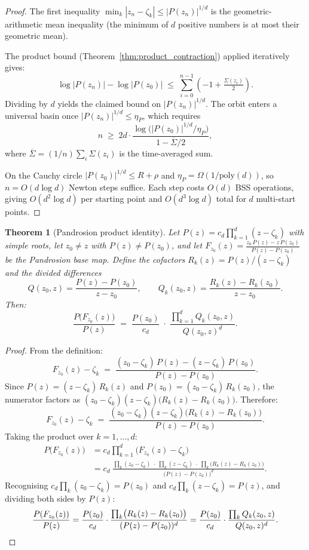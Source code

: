 \documentclass[10pt,a4paper,oneside]{book}
\newtheorem{theorem}{Theorem}[chapter]
\theoremstyle{definition}
\theoremstyle{remark}
\begin{document}
\begin{proof}
The first inequality $\min_k|z_n - \zeta_k| \leq |P(z_n)|^{1/d}$ is the geometric-arithmetic mean inequality (the minimum of $d$ positive numbers is at most their geometric mean).

The product bound (Theorem~\ref{thm:product_contraction}) applied iteratively gives:
\[
  \log|P(z_n)| - \log|P(z_0)| \;\leq\; \sum_{i=0}^{n-1}\left(-1 + \tfrac{\Sigma(z_i)}{2}\right).
\]
Dividing by $d$ yields the claimed bound on $|P(z_n)|^{1/d}$.  The orbit enters a universal basin once $|P(z_n)|^{1/d} \leq \eta_P$, which requires
\[
  n \;\geq\; 2d\cdot\frac{\log\bigl(|P(z_0)|^{1/d}/\eta_P\bigr)}{1 - \overline{\Sigma}/2},
\]
where $\overline{\Sigma} = (1/n)\sum_i \Sigma(z_i)$ is the time-averaged sum.

On the Cauchy circle $|P(z_0)|^{1/d} \leq R + \rho$ and $\eta_P = \Omega(1/\mathrm{poly}(d))$, so $n = O(d\log d)$ Newton steps suffice.  Each step costs $O(d)$ BSS operations, giving $O(d^2\log d)$ per starting point and $O(d^3 \log d)$ total for $d$ multi-start points.
\end{proof}

\begin{theorem}[Pandrosion product identity]
\label{thm:pandrosion_product}
Let $P(z) = c_d\prod_{k=1}^d (z - \zeta_k)$ with simple roots, let $z_0 \neq z$ with $P(z) \neq P(z_0)$, and let $F_{z_0}(z) = \frac{z_0\,P(z) - z\,P(z_0)}{P(z) - P(z_0)}$ be the Pandrosion base map.  Define the cofactors $R_k(z) = P(z)/(z - \zeta_k)$ and the divided differences
\[
  Q(z_0,z) = \frac{P(z) - P(z_0)}{z - z_0}, \qquad
  Q_k(z_0,z) = \frac{R_k(z) - R_k(z_0)}{z - z_0}.
\]
Then:
\begin{equation}
  \label{eq:pandrosion_product}
  \frac{P\bigl(F_{z_0}(z)\bigr)}{P(z)}
  \;=\; \frac{P(z_0)}{c_d} \;\cdot\; \frac{\displaystyle\prod_{k=1}^d Q_k(z_0,z)}{Q(z_0,z)^d}.
\end{equation}
\end{theorem}

\begin{proof}
From the definition:
\[
  F_{z_0}(z) - \zeta_k
  \;=\; \frac{(z_0 - \zeta_k)\,P(z) - (z - \zeta_k)\,P(z_0)}{P(z) - P(z_0)}.
\]
Since $P(z) = (z - \zeta_k)\,R_k(z)$ and $P(z_0) = (z_0 - \zeta_k)\,R_k(z_0)$, the numerator factors as $(z_0 - \zeta_k)(z - \zeta_k)\bigl(R_k(z) - R_k(z_0)\bigr)$.  Therefore:
\[
  F_{z_0}(z) - \zeta_k
  \;=\; \frac{(z_0 - \zeta_k)(z - \zeta_k)\bigl(R_k(z) - R_k(z_0)\bigr)}{P(z) - P(z_0)}.
\]
Taking the product over $k = 1, \ldots, d$:
\begin{align*}
  P\bigl(F_{z_0}(z)\bigr)
  &= c_d \prod_{k=1}^d \bigl(F_{z_0}(z) - \zeta_k\bigr) \\
  &= c_d \;\frac{\prod_k(z_0 - \zeta_k) \;\cdot\; \prod_k(z - \zeta_k) \;\cdot\; \prod_k\bigl(R_k(z) - R_k(z_0)\bigr)}{\bigl(P(z) - P(z_0)\bigr)^d}.
\end{align*}
Recognising $c_d\prod_k(z_0-\zeta_k) = P(z_0)$ and $c_d\prod_k(z-\zeta_k) = P(z)$, and dividing both sides by $P(z)$:
\[
  \frac{P(F_{z_0}(z))}{P(z)}
  = \frac{P(z_0)}{c_d} \cdot \frac{\prod_k\bigl(R_k(z)-R_k(z_0)\bigr)}{(P(z)-P(z_0))^d}
  = \frac{P(z_0)}{c_d} \cdot \frac{\prod_k Q_k(z_0,z)}{Q(z_0,z)^d}.
  \qedhere
\]
\end{proof}
\end{document}
